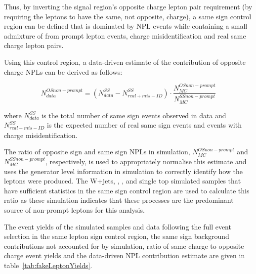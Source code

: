 Thus, by inverting the signal region's opposite charge lepton pair requirement (\ie by requiring the leptons to have the same, not opposite, charge), a same sign control region can be defined that is dominated by NPL events while containing a small admixture of from prompt lepton events, charge misidentification and real same charge lepton pairs.

Using this control region, a data-driven estimate of the contribution of opposite charge NPLs can be derived as follows:

\begin{equation}\label{eq:NPL}
N_{data}^{OS non-prompt} = (N_{data}^{SS} - N^{SS}_{real + mis-ID}) \cdot \frac{N_{MC}^{OS non-prompt}}{N_{MC}^{SS non-prompt}}
\end{equation}

where $N_{data}^{SS}$ is the total number of same sign events observed in data and $N^{SS}_{real + mis-ID}$ is the expected number of real same sign events and events with charge misidentification.

The ratio of opposite sign and same sign NPLs in simulation, $N_{MC}^{OS non-prompt}$ and $N_{MC}^{SS non-prompt}$, respectively, is used to appropriately normalise this estimate and uses the generator level information in simulation to correctly identify how the leptons were produced.
The W+jets, \ttZ, \ttW, and single top simulated samples that have sufficient statistics in the same sign control region are used to calculate this ratio as these simulation indicates that these processes are the predominant source of non-prompt leptons for this analysis.

The event yields of the simulated samples and data following the full event selection in the same lepton sign control region, the same sign background contributions not accounted for by simulation, ratio of same charge to opposite charge event yields and the data-driven NPL contribution estimate are given in table~\ref{tab:fakeLeptonYields}.


